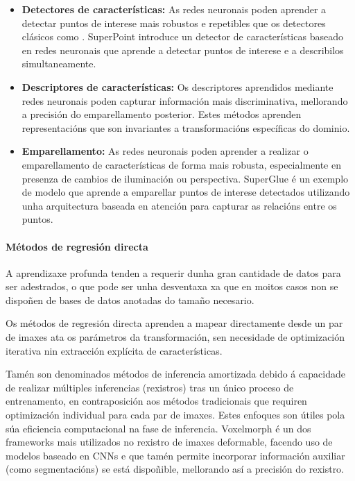 \begin{itemize}
\item \textbf{Detectores de características:} As redes neuronais poden aprender a detectar puntos de interese mais robustos e repetibles que os detectores clásicos como . SuperPoint \cite{superpoint} introduce un detector de características baseado en redes neuronais que aprende a detectar puntos de interese e a describilos simultaneamente.
\item \textbf{Descriptores de características:} Os descriptores aprendidos mediante redes neuronais poden capturar información mais discriminativa, mellorando a precisión do emparellamento posterior. Estes métodos aprenden representacións que son invariantes a transformacións específicas do dominio.
\item \textbf{Emparellamento:} As redes neuronais poden aprender a realizar o emparellamento de características de forma mais robusta, especialmente en presenza de cambios de iluminación ou perspectiva. SuperGlue \cite{superglue} é un exemplo de modelo que aprende a emparellar puntos de interese detectados utilizando unha arquitectura baseada en atención para capturar as relacións entre os puntos.
\end{itemize}

\paragraph{Métodos de regresión directa}
\label{par:direct_regression}

A aprendizaxe profunda tenden a requerir dunha gran cantidade de datos para ser adestrados, o que pode ser unha desventaxa xa que en moitos casos non se dispoñen de bases de datos anotadas do tamaño necesario.

Os métodos de regresión directa aprenden a mapear directamente desde un par de imaxes ata os parámetros da transformación, sen necesidade de optimización iterativa nin extracción explícita de características.

Tamén son denominados métodos de inferencia amortizada debido á capacidade de realizar múltiples inferencias (rexistros) tras un único proceso de entrenamento, en contraposición aos métodos tradicionais que requiren optimización individual para cada par de imaxes.
Estes enfoques son útiles pola súa eficiencia computacional na fase de inferencia. Voxelmorph \cite{Balakrishnan_2019voxelmorph} é un dos frameworks mais utilizados no rexistro de imaxes deformable, facendo uso de modelos baseado en \gls{CNN}s e que tamén permite incorporar información auxiliar (como segmentacións) se está dispoñible, mellorando así a precisión do rexistro.

